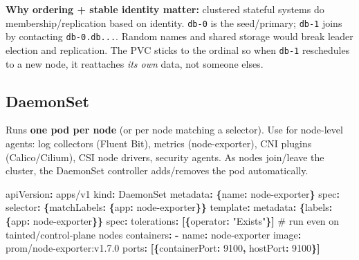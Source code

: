 \documentclass[11pt]{article}
\newenvironment{Shaded}{\begin{snugshade}}{\end{snugshade}}
\newcommand{\AttributeTok}[1]{\textcolor[rgb]{0.16,0.50,0.73}{#1}}
\newcommand{\CommentTok}[1]{\textcolor[rgb]{0.48,0.49,0.49}{#1}}
\newcommand{\DecValTok}[1]{\textcolor[rgb]{0.96,0.45,0.00}{#1}}
\newcommand{\FunctionTok}[1]{\textcolor[rgb]{0.56,0.27,0.68}{#1}}
\newcommand{\KeywordTok}[1]{\textcolor[rgb]{0.81,0.81,0.76}{\textbf{#1}}}
\newcommand{\StringTok}[1]{\textcolor[rgb]{0.96,0.31,0.31}{#1}}
\begin{document}
\textbf{Why ordering + stable identity matter:} clustered stateful systems do membership/replication based on identity. \texttt{db-0} is the seed/primary; \texttt{db-1} joins by contacting \texttt{db-0.db...}. Random names and shared storage would break leader election and replication. The PVC sticks to the ordinal so when \texttt{db-1} reschedules to a new node, it reattaches \emph{its own} data, not someone else\textquotesingle s.

\subsection{DaemonSet}\label{daemonset}

Runs \textbf{one pod per node} (or per node matching a selector). Use for node-level agents: log collectors (Fluent Bit), metrics (node-exporter), CNI plugins (Calico/Cilium), CSI node drivers, security agents. As nodes join/leave the cluster, the DaemonSet controller adds/removes the pod automatically.


\begin{Shaded}
\begin{Highlighting}[]
\FunctionTok{apiVersion}\KeywordTok{:}\AttributeTok{ apps/v1}
\FunctionTok{kind}\KeywordTok{:}\AttributeTok{ DaemonSet}
\FunctionTok{metadata}\KeywordTok{:}\AttributeTok{ }\KeywordTok{\{}\FunctionTok{name}\KeywordTok{:}\AttributeTok{ node{-}exporter}\KeywordTok{\}}
\FunctionTok{spec}\KeywordTok{:}
\AttributeTok{  }\FunctionTok{selector}\KeywordTok{:}\AttributeTok{ }\KeywordTok{\{}\FunctionTok{matchLabels}\KeywordTok{:}\AttributeTok{ }\KeywordTok{\{}\FunctionTok{app}\KeywordTok{:}\AttributeTok{ node{-}exporter}\KeywordTok{\}\}}
\AttributeTok{  }\FunctionTok{template}\KeywordTok{:}
\AttributeTok{    }\FunctionTok{metadata}\KeywordTok{:}\AttributeTok{ }\KeywordTok{\{}\FunctionTok{labels}\KeywordTok{:}\AttributeTok{ }\KeywordTok{\{}\FunctionTok{app}\KeywordTok{:}\AttributeTok{ node{-}exporter}\KeywordTok{\}\}}
\AttributeTok{    }\FunctionTok{spec}\KeywordTok{:}
\AttributeTok{      }\FunctionTok{tolerations}\KeywordTok{:}\AttributeTok{ }\KeywordTok{[\{}\FunctionTok{operator}\KeywordTok{:}\AttributeTok{ }\StringTok{"Exists"}\KeywordTok{\}]}\CommentTok{   \# run even on tainted/control{-}plane nodes}
\AttributeTok{      }\FunctionTok{containers}\KeywordTok{:}
\AttributeTok{        }\KeywordTok{{-}}\AttributeTok{ }\FunctionTok{name}\KeywordTok{:}\AttributeTok{ node{-}exporter}
\AttributeTok{          }\FunctionTok{image}\KeywordTok{:}\AttributeTok{ prom/node{-}exporter:v1.7.0}
\AttributeTok{          }\FunctionTok{ports}\KeywordTok{:}\AttributeTok{ }\KeywordTok{[\{}\FunctionTok{containerPort}\KeywordTok{:}\AttributeTok{ }\DecValTok{9100}\KeywordTok{,}\AttributeTok{ }\FunctionTok{hostPort}\KeywordTok{:}\AttributeTok{ }\DecValTok{9100}\KeywordTok{\}]}
\end{Highlighting}
\end{Shaded}
\end{document}
